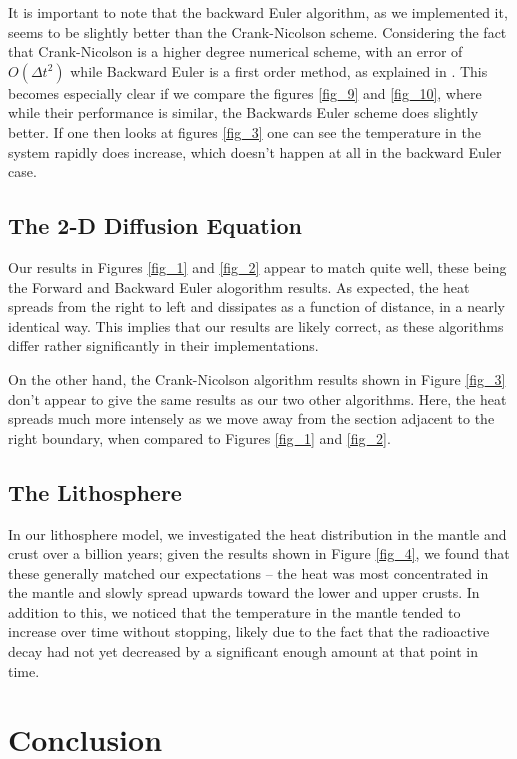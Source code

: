 \documentclass[a4paper,10pt,english]{article}
\begin{document}
It is important to note that the backward Euler algorithm, as we implemented it, seems to be slightly better than the Crank-Nicolson scheme. Considering the fact that Crank-Nicolson is a higher degree numerical scheme, with an error of $O(\Delta t^2)$ while Backward Euler is a first order method, as explained in \cite{compendium}. This becomes especially clear if we compare the figures \ref{fig_9} and \ref{fig_10}, where while their performance is similar, the Backwards Euler scheme does slightly better. If one then looks at figures \ref{fig_3} one can see the temperature in the system rapidly does increase, which doesn't happen at all in the backward Euler case. 

\subsection*{The 2-D Diffusion Equation}

Our results in Figures \ref{fig_1} and \ref{fig_2} appear to match quite well, these being the Forward and Backward Euler alogorithm results.  As expected, the heat spreads from the right to left and dissipates as a function of distance, in a nearly identical way.  This implies that our results are likely correct, as these algorithms differ rather significantly in their implementations.

On the other hand, the Crank-Nicolson algorithm results shown in Figure \ref{fig_3} don't appear to give the same results as our two other algorithms.  Here, the heat spreads much more intensely as we move away from the section adjacent to the right boundary, when compared to Figures \ref{fig_1} and \ref{fig_2}.

\subsection*{The Lithosphere}

In our lithosphere model, we investigated the heat distribution in the mantle and crust over a billion years; given the results shown in Figure \ref{fig_4}, we found that these generally matched our expectations – the heat was most concentrated in the mantle and slowly spread upwards toward the lower and upper crusts.  In addition to this, we noticed that the temperature in the mantle tended to increase over time without stopping, likely due to the fact that the radioactive decay had not yet decreased by a significant enough amount at that point in time.

\section*{Conclusion}
\end{document}
